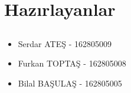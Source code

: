 \documentclass[compress,xcolor=table]{beamer}
\begin{document}
\section{Hazırlayanlar} \subsection{}
\begin{frame}


\begin{block}{ }
		
\begin{itemize}
\item Serdar ATEŞ - 162805009
\item Furkan TOPTAŞ - 162805008
\item Bilal BAŞULAŞ - 162805005



\end{itemize}

		
\end{block}
\end{frame}
\end{document}

